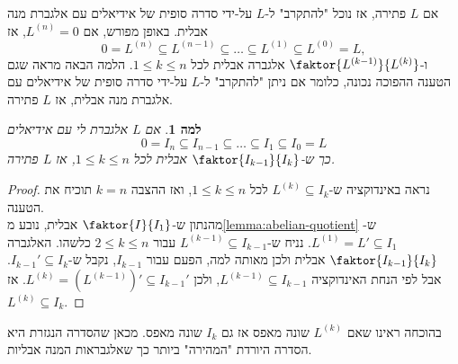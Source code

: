 \documentclass{report}
\theoremstyle{break}
\newtheorem{lemma}[lemma]{למה}
\theoremstyle{MyNonumberbreak}
\newtheorem{proof}{הוכחה}
\begin{document}
אם $L$ פתירה, אז נוכל "להתקרב" ל-$L$ על-ידי סדרה סופית של אידיאלים עם אלגברת מנה אבלית. באופן מפורש, אם $L^{(n)} = 0$, אז
\[ 0 = L^{(n)} \subseteq L^{(n-1)} \subseteq \ldots \subseteq L^{(1)} \subseteq L^{(0)} = L, \]
ו-$\faktor{L^{(k-1)}}{L^{(k)}}$ אלגברה אבלית לכל $1 \le k \le n$. הלמה הבאה מראה שגם הטענה ההפוכה נכונה, כלומר אם ניתן "להתקרב" ל-$L$ על-ידי סדרה סופית של אידיאלים עם אלגברת מנה אבלית, אז $L$ פתירה.
\begin{lemma}
	אם $L$ אלגברת לי עם אידיאלים
	\[ 0 = I_n \subseteq I_{n-1} \subseteq \ldots \subseteq I_1 \subseteq I_0 = L \]
	כך ש-$\faktor{I_{k-1}}{I_k}$ אבלית לכל $1 \le k \le n$, אז $L$ פתירה.
\end{lemma}
\begin{proof}
	נראה באינדוקציה ש-$L^{(k)} \subseteq I_k$ לכל $1 \le k \le n$, ואז ההצבה $k = n$ תוכיח את הטענה. \\
	מהנתון ש-$\faktor{I}{I_1}$ אבלית, נובע מ\autoref*{lemma:abelian-quotient} ש-$L^{(1)} = L' \subseteq I_1$. נניח ש-$L^{(k-1)} \subseteq I_{k-1}$ עבור $2 \le k \le n$ כלשהו. האלגברה $\faktor{I_{k-1}}{I_k}$ אבלית ולכן מאותה למה, הפעם עבור $I_{k-1}$, נקבל ש-$I_{k-1}' \subseteq I_k$. אבל לפי הנחת האינדוקציה $L^{(k-1)} \subseteq I_{k-1}$, ולכן $L^{(k)} = (L^{(k-1)})' \subseteq I_{k-1}'$. אז $L^{(k)} \subseteq I_k$.
\end{proof}
בהוכחה ראינו שאם $L^{(k)}$ שונה מאפס אז גם $I_k$ שונה מאפס. מכאן שהסדרה הנגזרת היא הסדרה היורדת "המהירה" ביותר כך שאלגבראות המנה אבליות.
\end{document}
